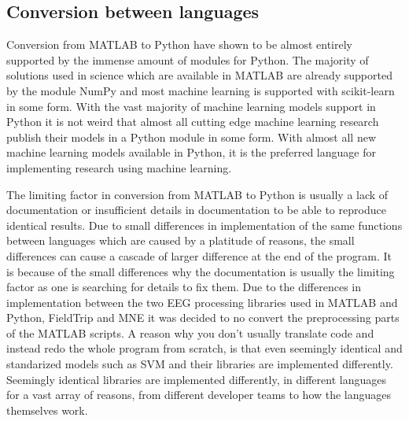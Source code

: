 \documentclass[12pt, a4paper]{article}
\begin{document}



\subsection{Conversion between languages}

Conversion from MATLAB to Python have shown to be almost entirely supported by the immense amount of modules for Python.
The majority of solutions used in science which are available in MATLAB are already supported by the module NumPy and most machine learning is supported with scikit-learn in some form.
With the vast majority of machine learning models support in Python it is not weird that almost all cutting edge machine learning research publish their models in a Python module in some form.
With almost all new machine learning models available in Python, it is the preferred language for implementing research using machine learning.

The limiting factor in conversion from MATLAB to Python is usually a lack of documentation or insufficient details in documentation to be able to reproduce identical results.
Due to small differences in implementation of the same functions between languages which are caused by a platitude of reasons, the small differences can cause a cascade of larger difference at the end of the program.
It is because of the small differences why the documentation is usually the limiting factor as one is searching for details to fix them.
Due to the differences in implementation between the two EEG processing libraries used in MATLAB and Python, FieldTrip and MNE it was decided to no convert the preprocessing parts of the MATLAB scripts.
A reason why you don't usually translate code and instead redo the whole program from scratch, is that even seemingly identical and standarized models such as SVM and their libraries are implemented differently.
Seemingly identical libraries are implemented differently, in different languages for a vast array of reasons, from different developer teams to how the languages themselves work.
\end{document}

